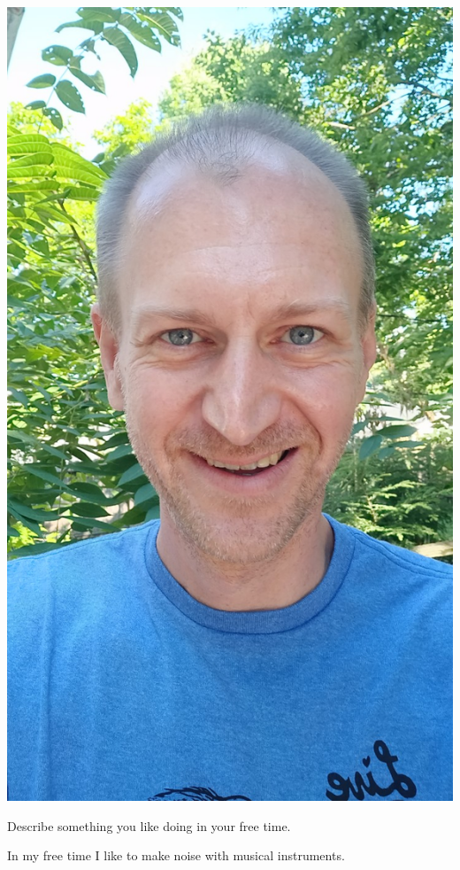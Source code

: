 \documentclass[nooutcomes,noauthor]{ximera}
\begin{document}
\begin{question}
\begin{freeResponse}
\begin{center}
      \includegraphics[height=.3\textheight]{me.jpg}
    \end{center}
  \end{freeResponse}
\end{question}
\mynewpage

\begin{question}
  Describe something you like doing in your free time.
  \begin{freeResponse}
    In my free time I like to make noise with musical instruments.
  \end{freeResponse}
\end{question}
\mynewpage
\end{document}
